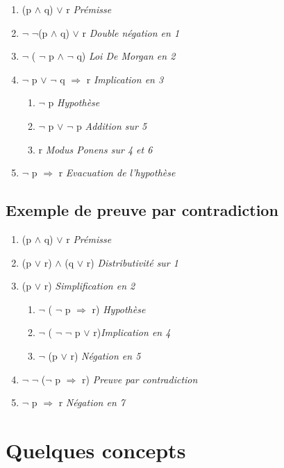 \begin{enumerate}
\item (p $\land$ q) $\lor$ r  \textit{Prémisse}
\item $\lnot$ $\lnot$(p $\land$ q) $\lor$ r \textit{Double négation en 1}
\item $\lnot$ ( $\lnot$ p $\land$ $\lnot$ q) \textit{Loi De Morgan en 2}
\item $\lnot$ p $\lor$ $\lnot$ q $\Rightarrow$ r \textit{Implication en 3}

\begin{enumerate}
 \item  $\lnot$ p \textit{Hypothèse}
 \item  $\lnot$ p $\lor$ $\lnot$ p \textit{ Addition sur 5}
 \item  r \textit{ Modus Ponens sur 4 et 6}
\end{enumerate}

\item  $\lnot$ p $\Rightarrow$ r \textit{Evacuation de l'hypothèse}
\end{enumerate}

\subsection{Exemple de preuve par contradiction}

\begin{enumerate}
\item  (p $\land$ q) $\lor$ r  \textit{Prémisse}
\item  (p  $\lor$ r) $\land$ (q $\lor$ r) \textit{Distributivité sur 1}
\item  (p $\lor$ r)  \textit{Simplification en 2}

\begin{enumerate}
 \item $\lnot$ ( $\lnot$ p $\Rightarrow$ r)  \textit{Hypothèse}
 \item $\lnot$ ( $\lnot$ $\lnot$ p $\lor$ r)\textit{Implication en 4}
 \item $\lnot$ (p $\lor$ r) \textit{ Négation en 5}
\end{enumerate}

\item $\lnot$ $\lnot$ ($\lnot$ p $\Rightarrow$ r)  \textit{ Preuve par contradiction}
\item $\lnot$ p $\Rightarrow$ r \textit{Négation en 7}
\end{enumerate}


\section{Quelques concepts}
